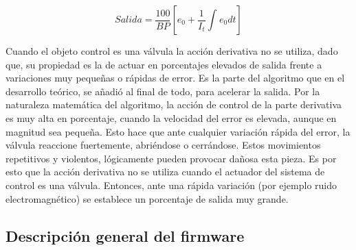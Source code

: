 \begin{equation}
 \label{eq:PID sin termino derivativo}
Salida =  \frac{100}{BP} [e_{0}+ \frac{1}{I_{t}} \int_{}^{} e_{0} dt]
\end{equation}

Cuando el objeto control es una válvula la acción derivativa no se utiliza, dado que, su propiedad es la de actuar en porcentajes elevados de salida frente a variaciones muy pequeñas o rápidas de error.
Es la parte del algoritmo que en el desarrollo teórico, se añadió al final de todo, para acelerar la salida.
Por la naturaleza matemática del algoritmo, la acción de control de la parte derivativa es muy alta en porcentaje, cuando la velocidad del error es elevada, aunque en magnitud sea pequeña. Esto hace que ante cualquier variación rápida del error, la válvula reaccione fuertemente, abriéndose o cerrándose. Estos movimientos repetitivos y violentos, lógicamente pueden provocar dañosa esta pieza. Es por esto que la acción derivativa no se utiliza cuando el actuador del sistema de control es una válvula. Entonces, ante una rápida variación (por ejemplo ruido electromagnético) se establece un porcentaje de salida muy grande. 


\subsection{Descripción general del firmware}
\label{subsec:Descripción del firmware}

